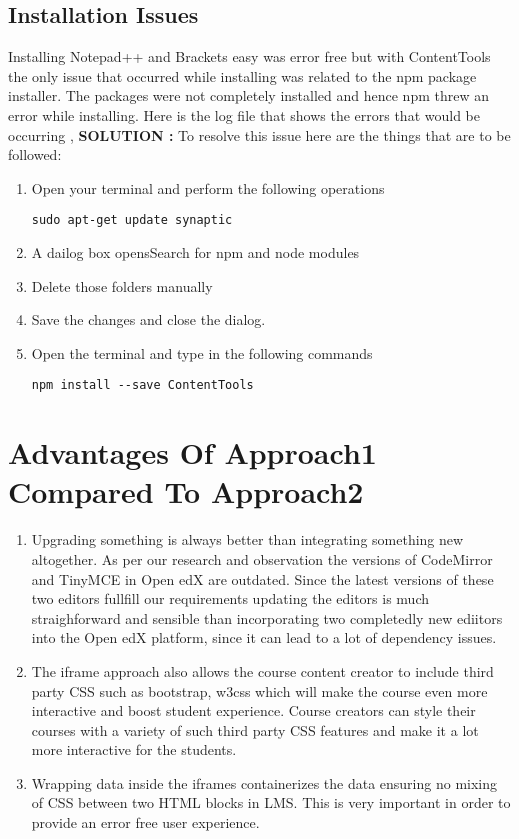 \subsection{Installation Issues}
Installing Notepad++ and Brackets easy was error free but with ContentTools the only issue
that occurred while installing was related to the npm package installer. \newline
The packages were not completely installed and hence npm threw an error while
installing. \newline \newline
Here is the log file that shows the errors that would be occurring , \newline 
[\url{https://drive.google.com/open?id=1KUe3jcAPg8DpxmhshPUBYPKya_B-oRSt}]
\newline 
\newline
\textbf{SOLUTION :} To resolve this issue here are the things that are to be followed: \newline
\begin{enumerate}
\item Open your terminal and perform the following operations 
\begin{center}\verb=sudo apt-get update synaptic=\end{center}
\item A dailog box opensSearch for npm and node modules
\item Delete those folders manually
\item Save the changes and close the dialog.
\item Open the terminal and type in the following commands
 \begin{center}\verb=npm install --save ContentTools=\end{center}

\end{enumerate}
\section{Advantages Of Approach1 Compared To Approach2}
\begin{enumerate}
\item Upgrading something is always better than integrating something new altogether. As per
our research and observation the versions of CodeMirror and TinyMCE in Open edX are
outdated. Since the latest versions of these two editors fullfill our requirements updating the
editors is much straighforward and sensible than incorporating two completedly new ediitors
into the Open edX platform, since it can lead to a lot of dependency issues.
\item The iframe approach also allows the course content creator to include third party CSS
such as bootstrap, w3css which will make the course even more interactive and boost
student experience. Course creators can style their courses with a variety of such third party
CSS features and make it a lot more interactive for the students.
\item Wrapping data inside the iframes containerizes the data ensuring no mixing of CSS
between two HTML blocks in LMS. This is very important in order to provide an error free
user experience.
\end{enumerate}


